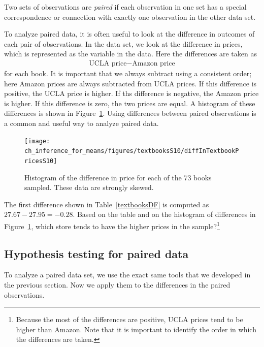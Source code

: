\begin{termBox}{
Two sets of observations are \emph{paired} if each observation in one set has a special correspondence or connection with exactly one observation in the other data set.}
\end{termBox}

To analyze paired data, it is often useful to look at the difference in outcomes of each pair of observations. In the  data set, we look at the difference in prices, which is represented as the  variable in the  data. Here the differences are taken as
\begin{eqnarray*}
\text{UCLA price} - \text{Amazon price}
\end{eqnarray*}
for each book. It is important that we always subtract using a consistent order; here Amazon prices are always subtracted from UCLA prices. If this difference is positive, the UCLA price is higher. If ths difference is negative, the Amazon price is higher. If this difference is zero, the two prices are equal. A histogram of these differences is shown in Figure~\ref{diffInTextbookPricesS10}. Using differences between paired observations is a common and useful way to analyze paired data.

\begin{figure}
\centering
\texttt{[image: ch\_inference\_for\_means/figures/textbooksS10/diffInTextbookPricesS10]}
\caption{Histogram of the difference in price for each of the 73 books sampled. These data are strongly skewed.}
\label{diffInTextbookPricesS10}
\end{figure}

\begin{exercise}
The first difference shown in Table~\ref{textbooksDF} is computed as $27.67-27.95=-0.28$. Based on the table and on the histogram of differences in Figure~\ref{diffInTextbookPricesS10}, which store tends to have the higher prices in the sample?\footnote{Because the most of the differences are positive, UCLA prices tend to be higher than Amazon. Note that it is important to identify the order in which the differences are taken.}
\end{exercise}


\subsection{Hypothesis testing for paired data}

To analyze a paired data set, we use the exact same tools that we developed in the previous section. Now we apply them to the differences in the paired observations.

